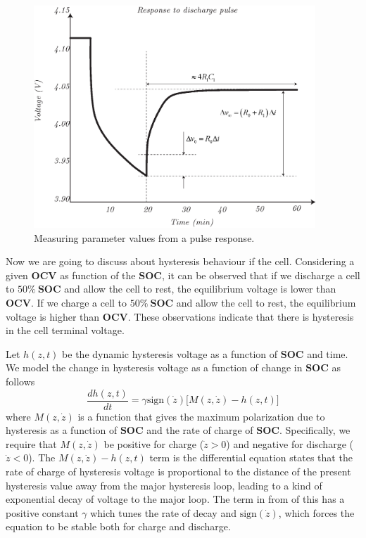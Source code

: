 \documentclass[11pt,a4paper,oneside]{book}
\numberwithin{equation}{section}
\newcommand{\sign}{\text{sign}}
\theoremstyle{it}
\theoremstyle{definition}
\begin{document}
\begin{figure}[H]
	\centering
	\includegraphics[width = 300pt, angle = 0, keepaspectratio]{figures/lithium_ion_battery/cell_response_2.eps}
	\captionsetup{width=0.5\textwidth, font=small}		
	\caption{Measuring parameter values from a pulse response.}
	\label{polarization_2}
\end{figure}
Now we are going to discuss about hysteresis behaviour if the cell. Considering a given $\mathbf{OCV}$ as function of the $\mathbf{SOC}$, it can be observed that if we discharge a cell to $50\%\ \mathbf{SOC}$ and allow the cell to rest, the equilibrium voltage is lower than $\mathbf{OCV}$. If we charge a cell to $50\%\ \mathbf{SOC}$ and allow the cell to rest, the equilibrium voltage is higher than $\mathbf{OCV}$. These observations indicate that there is hysteresis in the cell terminal voltage.

Let $h(z,t)$ be the dynamic hysteresis voltage as a function of $\mathbf{SOC}$ and time. We model the change in hysteresis voltage as a function of change in $\mathbf{SOC}$ as follows
\begin{equation}
	\frac{dh(z,t)}{dt} = \gamma\sign(\dot{z})\Big[M(z,\dot{z})-h(z,t)\Big]
\end{equation}
where $M(z,\dot{z})$ is a function that gives the maximum polarization due to hysteresis as a function of $\mathbf{SOC}$ and the rate of charge of $\mathbf{SOC}$.
Specifically, we require that $M(z,\dot{z})$ be positive for charge ($\dot{z}>0$) and negative for discharge ($\dot{z}<0$). The $M(z,\dot{z})-h(z,t)$ term is the differential equation states that the rate of charge of hysteresis voltage is proportional to the distance of the present hysteresis value away from the major hysteresis loop, leading to a kind of exponential decay of voltage to the major loop. The term in from of this has a positive constant $\gamma$ which tunes the rate of decay and $\sign(\dot{z})$, which forces the equation to be stable both for charge and discharge.
\end{document}
